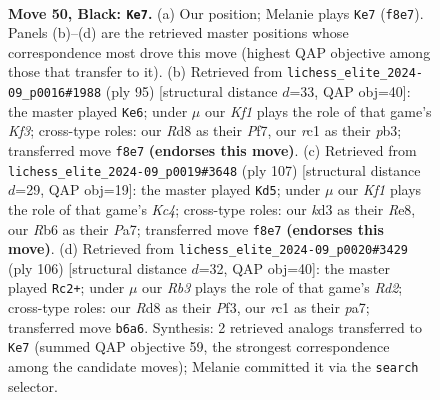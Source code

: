 \documentclass[11pt]{article}
\begin{document}
\clearpage

\begin{figure}[p]\centering
\begin{subfigure}{0.46\textwidth}\centering
\resizebox{\linewidth}{!}{%
\newchessgame
\chessboard[
  setfen={3r1k2/5p1p/1r6/p5P1/3p4/1P1K3N/1R5P/2R5 b - - 2 50},
  showmover=false,
  pgfstyle=straightmove, color=movearrow, markmove={f8-e7}
]}
\caption{}
\end{subfigure}\hfill
\begin{subfigure}{0.46\textwidth}\centering
\resizebox{\linewidth}{!}{%
\newchessgame
\chessboard[
  setfen={3r4/5p2/p2P1k1p/1pK5/8/1P1R3P/1P6/8 b - - 0 48},
  showmover=false,
  pgfstyle=straightmove, color=movearrow, markmove={f6-e6}
]}
\caption{}
\end{subfigure}
\\[4pt]
\begin{subfigure}{0.46\textwidth}\centering
\resizebox{\linewidth}{!}{%
\newchessgame
\chessboard[
  setfen={4r3/p1r1P1P1/4R3/1pk1N3/8/8/P1p2K1P/2B5 b - - 0 54},
  showmover=false,
  pgfstyle=straightmove, color=movearrow, markmove={c5-d5}
]}
\caption{}
\end{subfigure}\hfill
\begin{subfigure}{0.46\textwidth}\centering
\resizebox{\linewidth}{!}{%
\newchessgame
\chessboard[
  setfen={8/pp1r2p1/8/1Pk5/3p1K2/P4P1P/3R4/8 w - - 0 54},
  showmover=false,
  pgfstyle=straightmove, color=movearrow, markmove={d2-c2}
]}
\caption{}
\end{subfigure}
\caption{\textbf{Move 50, Black: \texttt{Ke7}.} (a) Our position; Melanie plays \texttt{Ke7} (\texttt{f8e7}). Panels (b)--(d) are the retrieved master positions whose correspondence most drove this move (highest QAP objective among those that transfer to it). (b) Retrieved from \texttt{lichess\_elite\_2024-09\_p0016\#1988} (ply 95) [structural distance $d$=33, QAP obj=40]: the master played \texttt{Ke6}; under $\mu$ our \emph{Kf1} plays the role of that game's \emph{Kf3}; cross-type roles: our \emph{R}d8 as their \emph{P}f7, our \emph{r}c1 as their \emph{p}b3; transferred move \texttt{f8e7} \textbf{(endorses this move)}. (c) Retrieved from \texttt{lichess\_elite\_2024-09\_p0019\#3648} (ply 107) [structural distance $d$=29, QAP obj=19]: the master played \texttt{Kd5}; under $\mu$ our \emph{Kf1} plays the role of that game's \emph{Kc4}; cross-type roles: our \emph{k}d3 as their \emph{R}e8, our \emph{R}b6 as their \emph{P}a7; transferred move \texttt{f8e7} \textbf{(endorses this move)}. (d) Retrieved from \texttt{lichess\_elite\_2024-09\_p0020\#3429} (ply 106) [structural distance $d$=32, QAP obj=40]: the master played \texttt{Rc2+}; under $\mu$ our \emph{Rb3} plays the role of that game's \emph{Rd2}; cross-type roles: our \emph{R}d8 as their \emph{P}f3, our \emph{r}c1 as their \emph{p}a7; transferred move \texttt{b6a6}. Synthesis: 2 retrieved analogs transferred to \texttt{Ke7} (summed QAP objective 59, the strongest correspondence among the candidate moves); Melanie committed it via the \texttt{search} selector.}
\label{fig:thought-m99}
\end{figure}
\end{document}
